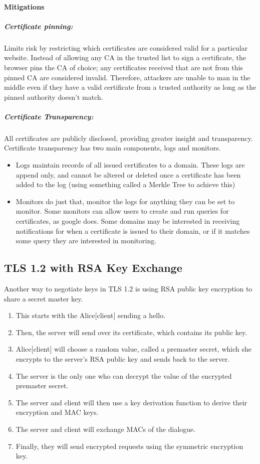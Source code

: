 \documentclass[11pt]{article} %
\begin{document}
{\paragraph{Mitigations}
\subparagraph {Certificate pinning:} Limits risk by restricting which certificates are considered valid for a particular website. Instead of allowing any CA in the trusted list to sign a certificate, the browser pins the CA of choice; any certificates received that are not from this pinned CA are considered invalid. Therefore, attackers are unable to man in the middle even if they have a valid certificate from a trusted authority as long as the pinned authority doesn't match.
\subparagraph {Certificate Transparency:} All certificates are publicly disclosed, providing greater insight and transparency. Certificate transparency has two main components, logs and monitors.
 \begin{itemize}
    \item Logs maintain records of all issued certificates to a domain. These logs are append only, and cannot be altered or deleted once a certificate has been added to the log (using something called a Merkle Tree to achieve this)
    \item Monitors do just that, monitor the logs for anything they can be set to monitor. Some monitors can allow users to create and run queries for certificates, as google does. Some domains may be interested in receiving notifications for when a certificate is issued to their domain, or if it matches some query they are interested in monitoring.
\end{itemize}

\newpage
\subsection{TLS 1.2 with RSA Key Exchange}
Another way to negotiate keys in TLS 1.2 is using RSA public key encryption to 
share a secret master key.

\begin{enumerate}
  \item This starts with the Alice[client] sending a hello.
  \item Then, the server will send over its certificate, which contains its 
  public key.
  \item Alice[client] will choose a random value, called a premaster secret, 
  which she encrypts to the server's RSA public key and sends back to the 
  server.
  \item The server is the only one who can decrypt the value of the encrypted 
  premaster secret.
  \item The server and client will then use a key derivation function to 
  derive their encryption and MAC keys.
  \item The server and client will exchange MACs of the dialogue.
  \item Finally, they will send encrypted requests using the symmetric 
  encryption key.
\end{enumerate}

}
\end{document}
